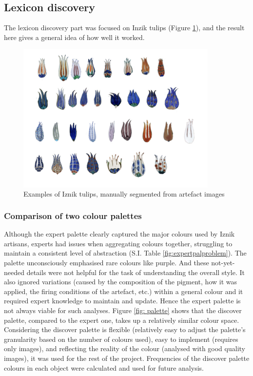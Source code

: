 \documentclass[11pt]{article}
\begin{document}
\subsection{Lexicon discovery} 
The lexicon discovery part was focused on Inzik tulips (Figure \ref{fig:Iznik}), and the result here gives a general idea of how well it worked.
\begin{figure}[H]
\centering
\includegraphics[width=10cm]{Proposal/tulipcol.jpg}
\caption{Examples of Iznik tulips, manually segmented from artefact images} 
\label{fig:Iznik}
\end{figure} 
\subsubsection{Comparison of two colour palettes}
Although the expert palette clearly captured the major colours used by Iznik artisans, experts had issues when aggregating colours together, struggling to maintain a consistent level of abstraction (S.I. Table \ref{fig:expertpalproblem}). The palette unconsciously emphasised rare colours like purple. And these not-yet-needed details were not helpful for the task of understanding the overall style. It also ignored variations (caused by the composition of the pigment, how it was applied, the firing conditions of the artefact, etc.) within a general colour and it required expert knowledge to maintain and update. Hence the expert palette is not always viable for such analyses. Figure \ref{fig: palette} shows that the discover palette, compared to the expert one, takes up a relatively similar colour space. Considering the discover palette is flexible (relatively easy to adjust the palette's granularity based on the number of colours used), easy to implement (requires only images), and reflecting the reality of the colour (analysed with good quality images), it was used for the rest of the project. Frequencies of the discover palette colours in each object were calculated and used for future analysis.\par
\end{document}
